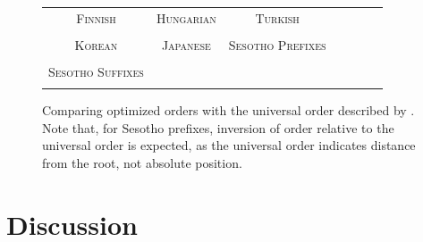 \documentclass[11pt,letterpaper]{article}
\begin{document}
\begin{figure}
\begin{tabular}{ccccccc}
\textsc{Finnish} & \textsc{Hungarian} & \textsc{Turkish} \\
\begin{minipage}{.3\textwidth}
  
    \end{minipage}
    &
    \begin{minipage}{.3\textwidth}
  
    \end{minipage}
        &
    \begin{minipage}{.3\textwidth}
  
    \end{minipage} 
    \\
    \textsc{Korean} & \textsc{Japanese} & \textsc{Sesotho Prefixes} \\
        \begin{minipage}{.3\textwidth}
  
    \end{minipage}
    &
    \begin{minipage}{.3\textwidth}
  
    \end{minipage}
        &
    \begin{minipage}{.3\textwidth}
  
    \end{minipage}
    \\
    \textsc{Sesotho Suffixes} \\
        \begin{minipage}{.3\textwidth}
  
    \end{minipage}
\end{tabular}
    \caption{Comparing optimized orders with the universal order described by \citep{bybee-morphology-1985}.  Note that, for Sesotho prefixes, inversion of order relative to the universal order is expected, as the universal order indicates distance from the root, not absolute position.}
    \label{fig:optimized_and_universal_orders}
\end{figure}


\section{Discussion}
\end{document}
